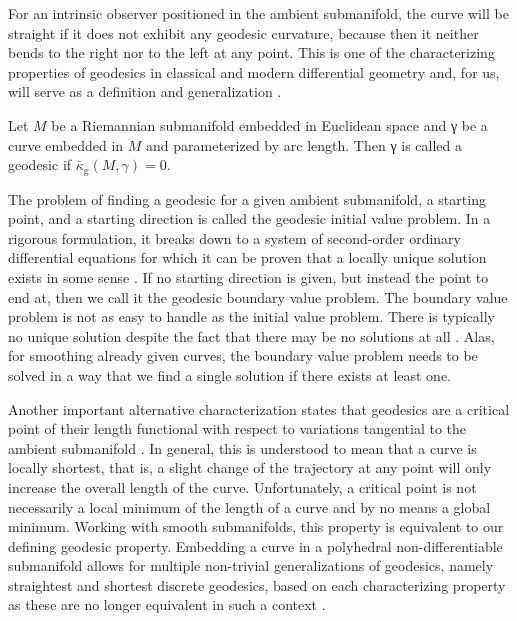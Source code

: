 \documentclass{stdlocal}
\begin{document}
  For an intrinsic observer positioned in the ambient submanifold, the curve will be straight if it does not exhibit any geodesic curvature, because then it neither bends to the right nor to the left at any point.
  This is one of the characterizing properties of geodesics in classical and modern differential geometry and, for us, will serve as a definition and generalization \autocite{goldhorn2009,carmo2016,kuehnel2013,polthier2006}.

  \begin{definition}[Geodesic]
    Let $M$ be a Riemannian submanifold embedded in Euclidean space and γ be a curve embedded in $M$ and parameterized by arc length.
    Then γ is called a geodesic if $\bar{κ}_\mathrm{g}(M,γ) = 0$.
  \end{definition}
  The problem of finding a geodesic for a given ambient submanifold, a starting point, and a starting direction is called the geodesic initial value problem.
  In a rigorous formulation, it breaks down to a system of second-order ordinary differential equations for which it can be proven that a locally unique solution exists in some sense \autocite{polthier2006}.
  If no starting direction is given, but instead the point to end at, then we call it the geodesic boundary value problem.
  The boundary value problem is not as easy to handle as the initial value problem.
  There is typically no unique solution despite the fact that there may be no solutions at all \autocite{polthier2006}.
  Alas, for smoothing already given curves, the boundary value problem needs to be solved in a way that we find a single solution if there exists at least one.
  \autocite{goldhorn2009,carmo2016,kuehnel2013}

  Another important alternative characterization states that geodesics are a critical point of their length functional with respect to variations tangential to the ambient submanifold \autocite{polthier2006}.
  In general, this is understood to mean that a curve is locally shortest, that is, a slight change of the trajectory at any point will only increase the overall length of the curve.
  Unfortunately, a critical point is not necessarily a local minimum of the length of a curve and by no means a global minimum.
  Working with smooth submanifolds, this property is equivalent to our defining geodesic property.
  Embedding a curve in a polyhedral non-differentiable submanifold allows for multiple non-trivial generalizations of geodesics, namely straightest and shortest discrete geodesics, based on each characterizing property as these are no longer equivalent in such a context \autocite{polthier2006}.
\end{document}

